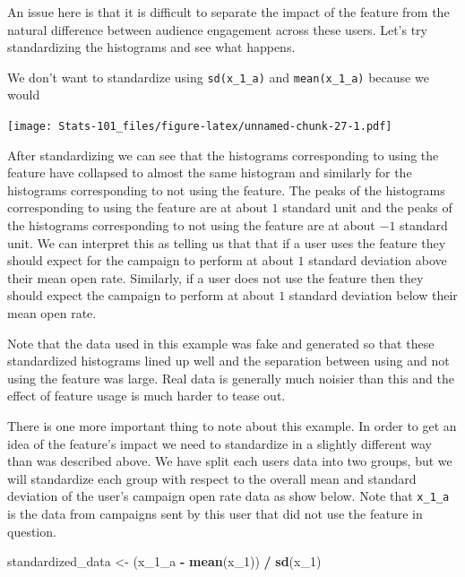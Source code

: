 \documentclass[]{book}
\newenvironment{Shaded}{\begin{snugshade}}{\end{snugshade}}
\newcommand{\DecValTok}[1]{\textcolor[rgb]{0.00,0.00,0.81}{#1}}
\newcommand{\KeywordTok}[1]{\textcolor[rgb]{0.13,0.29,0.53}{\textbf{#1}}}
\newcommand{\NormalTok}[1]{#1}
\newcommand{\OperatorTok}[1]{\textcolor[rgb]{0.81,0.36,0.00}{\textbf{#1}}}
\newcommand{\StringTok}[1]{\textcolor[rgb]{0.31,0.60,0.02}{#1}}
\begin{document}
An issue here is that it is difficult to separate the impact of the feature from the natural difference between audience engagement across these users. Let's try standardizing the histograms and see what happens.

We don't want to standardize using \texttt{sd(x\_1\_a)} and \texttt{mean(x\_1\_a)} because we would

\texttt{[image: Stats-101\_files/figure-latex/unnamed-chunk-27-1.pdf]}

After standardizing we can see that the histograms corresponding to using the feature have collapsed to almost the same histogram and similarly for the histograms corresponding to not using the feature. The peaks of the histograms corresponding to using the feature are at about \(1\) standard unit and the peaks of the histograms corresponding to not using the feature are at about \(-1\) standard unit. We can interpret this as telling us that that if a user uses the feature they should expect for the campaign to perform at about \(1\) standard deviation above their mean open rate. Similarly, if a user does not use the feature then they should expect the campaign to perform at about \(1\) standard deviation below their mean open rate.

Note that the data used in this example was fake and generated so that these standardized histograms lined up well and the separation between using and not using the feature was large. Real data is generally much noisier than this and the effect of feature usage is much harder to tease out.

There is one more important thing to note about this example. In order to get an idea of the feature's impact we need to standardize in a slightly different way than was described above. We have split each users data into two groups, but we will standardize each group with respect to the overall mean and standard deviation of the user's campaign open rate data as show below. Note that \texttt{x\_1\_a} is the data from campaigns sent by this user that did not use the feature in question.

\begin{Shaded}
\begin{Highlighting}[]
\NormalTok{standardized_data <-}\StringTok{ }\NormalTok{(x_}\DecValTok{1}\NormalTok{_a }\OperatorTok{-}\StringTok{ }\KeywordTok{mean}\NormalTok{(x_}\DecValTok{1}\NormalTok{)) }\OperatorTok{/}\StringTok{ }\KeywordTok{sd}\NormalTok{(x_}\DecValTok{1}\NormalTok{)}
\end{Highlighting}
\end{Shaded}
\end{document}
